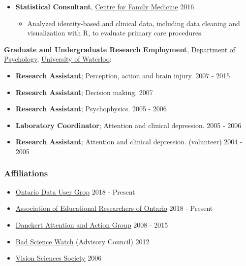 \documentclass[10pt]{article}
\providecommand{\tightlist}{%
  \setlength{\itemsep}{0pt}\setlength{\parskip}{0pt}}
\begin{document}
\pagebreak[2]

\begin{itemize}
\item
  \textbf{Statistical Consultant},
  \href{https://family-medicine.ca/}{Centre for Family Medicine}
  \hfill 2016

  \begin{itemize}
  \tightlist
  \item
    Analyzed identity-based and clinical data, including data cleaning
    and visualization with R, to evaluate primary care procedures.
  \end{itemize}
\end{itemize}

\pagebreak[2]

\textbf{Graduate and Undergraduate Research Employment},
\href{http://psychology.uwaterloo.ca}{Department of Psychology},
\href{http://www.uwaterloo.ca/}{University of Waterloo}:

\begin{itemize}
\tightlist
\item
  \textbf{Research Assistant}; Perception, action and brain injury.
  \hfill 2007 - 2015
\item
  \textbf{Research Assistant}; Decision making. \hfill             2007
\item
  \textbf{Research Assistant}; Psychophysics. \hfill               2005
  - 2006
\item
  \textbf{Laboratory Coordinator}; Attention and clinical depression.
  \hfill                 2005 - 2006
\item
  \textbf{Research Assistant}; Attention and clinical depression.
  (volunteer) \hfill                    2004 - 2005
\end{itemize}

\pagebreak[3]

\subsubsection{Affiliations}\label{affiliations}

\begin{itemize}
\tightlist
\item
  \href{https://dugroup.ca/about/}{Ontario Data User Grop} \hfill 2018 -
  Present
\item
  \href{https://www.aero-aoce.org}{Association of Educational
  Researchers of Ontario} \hfill 2018 - Present
\item
  \href{http://thedaag.uwaterloo.ca/}{Danckert Attention and Action
  Group} \hfill 2008 - 2015
\item
  \href{http://badsciencewatch.ca}{Bad Science Watch} (Advisory Council)
  \hfill 2012
\item
  \href{VisionSciences.ca}{Vision Sciences Society} \hfill 2006
\end{itemize}
\end{document}
